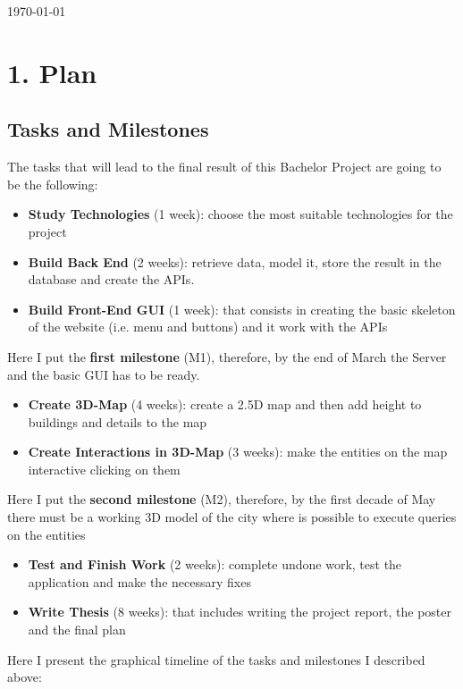 \documentclass[a4paper]{article}
\begin{document}
\begin{titlepage}

{\large \today}\\[3cm] %



 

\vfill %

\end{titlepage}
\section*{1. Plan}
\subsection*{Tasks and Milestones}
The tasks that will lead to the final result of this Bachelor Project are going to be the following:
\begin{itemize}
	\item {\bf Study Technologies} (1 week): choose the most suitable technologies for the project
	\item {\bf Build Back End} (2 weeks): retrieve data, model it, store the result in the database and create the APIs.
	\item {\bf Build Front-End GUI} (1 week): that consists in creating the basic skeleton of the website (i.e. menu and buttons) and it work with the APIs
\end{itemize}
Here I put the {\bf first milestone} (M1), therefore, by the end of March the Server and the basic GUI has to be ready.
\begin{itemize}
	\item {\bf Create 3D-Map} (4 weeks): create a 2.5D map and then add height to buildings and details to the map
	\item {\bf Create Interactions in 3D-Map} (3 weeks): make the entities on the map interactive clicking on them
\end{itemize}
Here I put the {\bf second milestone} (M2), therefore, by the first decade of May there must be a working 3D model of the city where is possible to execute queries on the entities
\begin{itemize}
	\item {\bf Test and Finish Work} (2 weeks): complete undone work, test the application and make the necessary fixes
	\item {\bf Write Thesis} (8 weeks): that includes writing the project report, the poster and the final plan
\end{itemize}
Here I present the graphical timeline of the tasks and milestones I described above:\\
\end{document}
